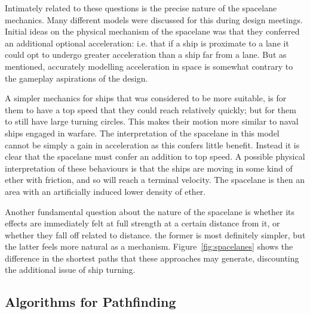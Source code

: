 Intimately related to these questions is the precise nature of the spacelane mechanics. Many different models were discussed for this during design meetings. Initial ideas on the physical mechanism of the spacelane was that they conferred an additional optional acceleration: i.e. that if a ship is proximate to a lane it could opt to undergo greater acceleration than a ship far from a lane. But as mentioned, accurately modelling acceleration in space is somewhat contrary to the gameplay aspirations of the design. 

A simpler mechanics for ships that was considered to be more suitable, is for them to have a top speed that they could reach relatively quickly; but for them to still have large turning circles. This makes their motion more similar to naval ships engaged in warfare. The interpretation of the spacelane in this model cannot be simply a gain in acceleration as this confers little benefit. Instead it is clear that the spacelane must confer an addition to top speed. A possible physical interpretation of these behaviours is that the ships are moving in some kind of ether with friction, and so will reach a terminal velocity. The spacelane is then an area with an  artificially induced lower density of ether.

Another fundamental question about the nature of the spacelane is whether its effects are immediately felt at full strength at a certain distance from it, or whether they fall off related to distance. the former is most definitely simpler, but the latter feels more natural as a mechanism. Figure~\ref{fig:spacelanes} shows the difference in the shortest paths that these approaches may generate, discounting the additional issue of ship turning.

\subsection{Algorithms for Pathfinding}

